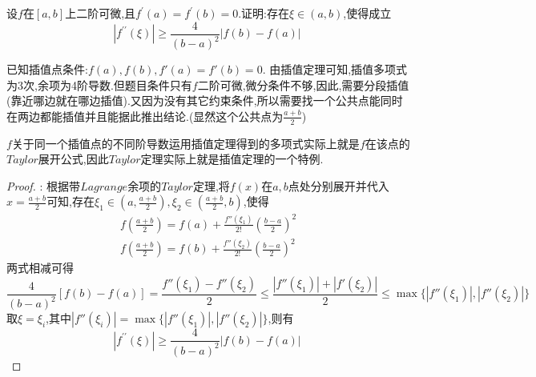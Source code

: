 \documentclass[lang=cn,newtx,10pt,scheme=chinese]{elegantbook}
\begin{document}
\begin{exercise}
    设\(f\)在\([a,b]\)上二阶可微,且\(f^{\prime}(a)=f^{\prime}(b)=0\).证明:存在\(\xi\in(a,b)\),使得成立
    \begin{equation}
        \left| f^{\prime\prime}(\xi ) \right|\ge \frac{4}{(b-a)^2}\left| f(b)-f(a) \right|\
        \nonumber
    \end{equation}
    \begin{note}
    已知插值点条件:$f(a),f(b),f'(a)=f'(b)=0$.
    由插值定理可知,插值多项式为3次,余项为4阶导数.但题目条件只有$f$二阶可微,微分条件不够,因此,需要分段插值(靠近哪边就在哪边插值).又因为没有其它约束条件,所以需要找一个公共点能同时在两边都能插值并且能据此推出结论.(显然这个公共点为$\frac{a+b}{2}$)
\end{note}
\begin{remark}
        $f$关于同一个插值点的不同阶导数运用插值定理得到的多项式实际上就是$f$在该点的$Taylor$展开公式,因此$Taylor$定理实际上就是插值定理的一个特例.
\end{remark}
    \begin{proof}
    {\color{blue} }:
    根据带$Lagrange$余项的$Taylor$定理,将$f(x)$在$a,b$点处分别展开并代入$x=\frac{a+b}{2}$可知,存在$\xi_1\in(a,\frac{a+b}{2}),\xi_2\in(\frac{a+b}{2},b)$,使得
    \begin{gather}
    f(\frac{a+b}{2})=f(a)+\frac{f''(\xi_1)}{2!}(\frac{b-a}{2})^2
    \nonumber
    \\
    f(\frac{a+b}{2})=f(b)+\frac{f''(\xi_2)}{2!}(\frac{b-a}{2})^2
    \nonumber
    \end{gather}
    两式相减可得
    \begin{equation}
    \frac{4}{(b-a)^2}[f(b)-f(a)]=\frac{f''(\xi_1)-f''(\xi_2)}{2}\leqslant \frac{|f''(\xi_1)|+|f'(\xi_2)|}{2}\leqslant \max\{|f''(\xi_1)|,|f''(\xi_2)|\}
        \nonumber
    \end{equation}
    取$\xi=\xi_i$,其中$|f''(\xi_i)|= \max\{|f''(\xi_1)|,|f''(\xi_2)|\}$,则有
    \begin{equation}
\left| f^{\prime\prime}(\xi ) \right|\ge \frac{4}{(b-a)^2}\left| f(b)-f(a) \right|\
        \nonumber
    \end{equation}
    

\end{proof}
\end{exercise}
\end{document}
